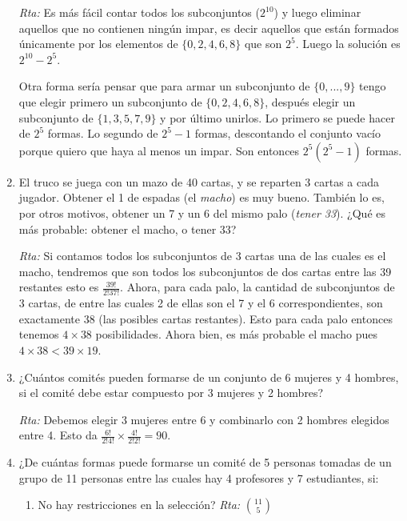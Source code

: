 \documentclass[a4paper,12pt,twoside,spanish,reqno]{amsbook}
\numberwithin{equation}{section}
\begin{document}
\begin{enumerate}
\noindent\textit{Rta:} Es más fácil contar todos los subconjuntos ($2^{10}$) y luego eliminar aquellos que no contienen ningún impar, es decir aquellos que están formados únicamente por los elementos de $\{0,2,4,6,8\}$ que son $2^5$. Luego la solución es $2^{10}-2^5$.

Otra forma sería pensar que para armar un subconjunto de $\{0,...,9\}$ tengo que elegir primero un subconjunto de $\{0,2,4,6,8\}$, después elegir un subconjunto de $\{1,3,5,7,9\}$ y por último unirlos. Lo primero se puede hacer de $2^5$ formas. Lo segundo de $2^5-1$ formas, descontando el conjunto vacío porque quiero que haya al menos un impar. Son entonces $2^5 (2^5 - 1)$ formas.

\medskip

\item El truco se juega con un mazo de 40 cartas, y se reparten 3 cartas a cada jugador. Obtener el 1 de espadas (el {\it macho}) es muy bueno. También lo es, por otros motivos, obtener un 7 y un 6 del mismo palo ({\it tener 33}). ¿Qué es más probable: obtener el macho, o tener 33?

\noindent\textit{Rta:} Si contamos todos los subconjuntos de 3 cartas una de las cuales es el macho, tendremos que son todos los subconjuntos de dos cartas entre las 39 restantes esto es $\frac{39!}{2!37!}$.
Ahora, para cada palo, la cantidad de subconjuntos de 3 cartas, de entre las cuales 2 de ellas son el 7 y el 6 correspondientes, son exactamente 38 (las posibles cartas restantes). Esto para cada palo entonces tenemos $4\times 38$ posibilidades. Ahora bien, es más probable el macho pues $4\times 38< 39\times 19$. 

\medskip

\item ¿Cuántos comités pueden formarse de un conjunto de 6 mujeres y 4 hombres, si el comité debe estar compuesto por 3 mujeres y 2 hombres?

\noindent\textit{Rta:} Debemos elegir 3 mujeres entre 6 y combinarlo con 2 hombres elegidos entre 4. Esto da $\frac{6!}{2!4!}\times \frac{4!}{2!2!}=90$.

\medskip

\item ¿De cuántas formas puede formarse un comité de 5 personas tomadas de un grupo
de 11 personas entre las cuales hay 4 profesores y 7 estudiantes, si:
\begin{enumerate}
\item 
No hay restricciones en la selección?
\noindent\textit{Rta:}  $\binom{11}{5}$


\end{enumerate}
\end{enumerate}
\end{document}
